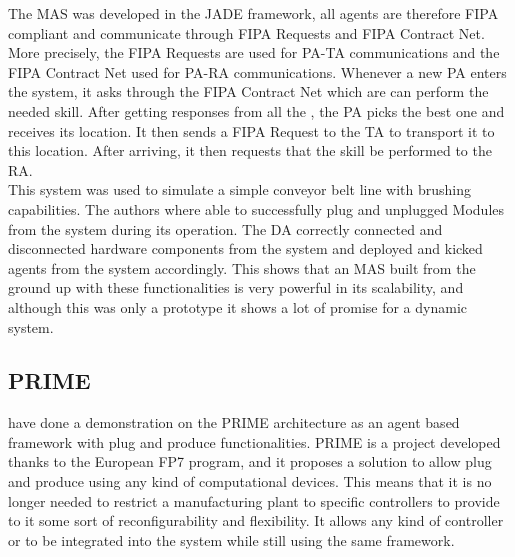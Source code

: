 The \acrshort{MAS} was developed in the \acrshort{JADE} framework, all agents are therefore \acrshort{FIPA} compliant and communicate through \acrshort{FIPA} Requests and \acrshort{FIPA} Contract Net. More precisely, the \acrshort{FIPA} Requests are used for \acrshort{PA}-\acrshort{TA} communications and the \acrshort{FIPA} Contract Net used for \acrshort{PA}-\acrshort{RA} communications. Whenever a new \acrshort{PA} enters the system, it asks through the \acrshort{FIPA} Contract Net which  are can perform the needed skill. After getting responses from all the , the \acrshort{PA} picks the best one and receives its location. It then sends a \acrshort{FIPA} Request to the \acrshort{TA} to transport it to this location. After arriving, it then requests that the skill be performed to the \acrshort{RA}.\\

This system was used to simulate a simple conveyor belt line with brushing capabilities. The authors where able to successfully plug and unplugged Modules from the system during its operation. The \acrshort{DA} correctly connected and disconnected hardware components from the system and deployed and kicked agents from the system accordingly. This shows that an \acrshort{MAS} built from the ground up with these functionalities is very powerful in its scalability, and although this was only a prototype it shows a lot of promise for a dynamic system.

\subsection{PRIME}

\citeauthor{PRIME_plug_and_produce} \cite{PRIME_plug_and_produce} have done a demonstration on the PRIME architecture as an agent based framework with plug and produce functionalities. PRIME is a project developed thanks to the European FP7 program, and it proposes a solution to allow plug and produce using any kind of computational devices. This means that it is no longer needed to restrict a manufacturing plant to specific controllers to provide to it some sort of reconfigurability and flexibility. It allows any kind of controller or to be integrated into the system while still using the same framework.\\


